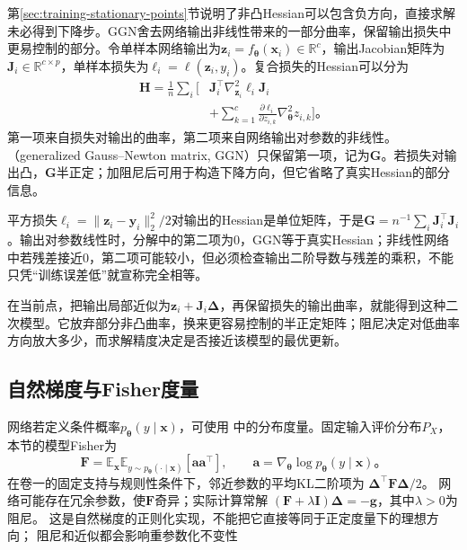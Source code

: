 第\ref{sec:training-stationary-points}节说明了非凸Hessian可以包含负方向，直接求解未必得到下降步。GGN舍去网络输出非线性带来的一部分曲率，保留输出损失中更易控制的部分。令单样本网络输出为$\bm z_i=f_{\bm\theta}(\bm x_i)\in\mathbb R^c$，输出Jacobian矩阵为$\bm J_i\in\mathbb R^{c\times p}$，单样本损失为$\ell_i=\ell(\bm z_i,y_i)$。复合损失的Hessian可以分为
\begin{equation}
  \begin{aligned}
  \bm H=\frac1n\sum_i\bigg[
    &\bm J_i^{\top}\nabla_{\bm z_i}^2\ell_i\bm J_i\\
    &+\sum_{k=1}^c\frac{\partial\ell_i}{\partial z_{i,k}}
         \nabla_{\bm\theta}^2z_{i,k}\bigg]\text{。}
  \end{aligned}
  \label{eq:training-hessian-decomposition}
\end{equation}
第一项来自损失对输出的曲率，第二项来自网络输出对参数的非线性。（generalized Gauss--Newton matrix, GGN）只保留第一项，记为$\bm G$。若损失对输出凸，$\bm G$半正定；加阻尼后可用于构造下降方向，但它省略了真实Hessian的部分信息。

平方损失$\ell_i=\lVert\bm z_i-\bm y_i\rVert_2^2/2$对输出的Hessian是单位矩阵，于是$\bm G=n^{-1}\sum_i\bm J_i^{\top}\bm J_i$。输出对参数线性时，分解中的第二项为0，GGN等于真实Hessian；非线性网络中若残差接近0，第二项可能较小，但必须检查输出二阶导数与残差的乘积，不能只凭“训练误差低”就宣称完全相等。

在当前点，把输出局部近似为$\bm z_i+\bm J_i\bm\Delta$，再保留损失的输出曲率，就能得到这种二次模型。它放弃部分非凸曲率，换来更容易控制的半正定矩阵；阻尼决定对低曲率方向放大多少，而求解精度决定是否接近该模型的最优更新。

\subsection{自然梯度与Fisher度量}
\label{sec:training-natural-gradient}

网络若定义条件概率$p_{\bm\theta}(y\mid\bm x)$，可使用
中的分布度量。固定输入评价分布$P_X$，本节的模型Fisher为
\begin{equation}
  \bm F=\mathbb E_{\bm x}\mathbb E_{y\sim p_{\bm\theta}(\cdot\mid\bm x)}
    [\bm a\bm a^{\top}],\qquad
  \bm a=\nabla_{\bm\theta}\log p_{\bm\theta}(y\mid\bm x)\text{。}
  \label{eq:training-fisher}
\end{equation}
在卷一的固定支持与规则性条件下，邻近参数的平均KL二阶项为
$\bm\Delta^\top\bm F\bm\Delta/2$。
网络可能存在冗余参数，使$\bm F$奇异；实际计算常解
$(\bm F+\lambda\bm I)\bm\Delta=-\bm g$，其中$\lambda>0$为阻尼。
这是自然梯度的正则化实现，不能把它直接等同于正定度量下的理想方向；
阻尼和近似都会影响重参数化不变性


